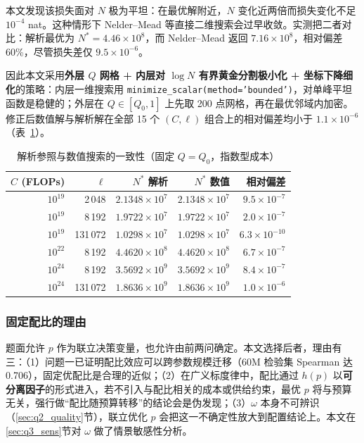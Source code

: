 本文发现该损失面对 $N$ 极为平坦：在最优解附近，$N$ 变化近两倍而损失变化不足 $10^{-4}$ nat。这种情形下 Nelder--Mead 等直接二维搜索会过早收敛。实测把二者对比：解析最优为 $N^\ast=4.46\times10^8$，而 Nelder--Mead 返回 $7.16\times10^8$，相对偏差 60\%，尽管损失差仅 $9.5\times10^{-6}$。

因此本文采用\textbf{外层 $Q$ 网格 + 内层对 $\log N$ 有界黄金分割极小化 + 坐标下降细化}的策略：内层一维搜索用 \texttt{minimize\_scalar(method='bounded')}，对单峰平坦函数是稳健的；外层在 $Q\in[Q_0,1]$ 上先取 200 点网格，再在最优邻域内加密。修正后数值解与解析解在全部 15 个 $(C,\ell)$ 组合上的相对偏差均小于 $1.1\times10^{-6}$（表~\ref{tab:q3_analytic}）。

\begin{table}[htbp]
\centering
\caption{解析参照与数值搜索的一致性（固定 $Q=Q_0$，指数型成本）}
\label{tab:q3_analytic}
\small
\begin{tabular}{r|r|r|r|r}
\toprule
$C$ (FLOPs) & $\ell$ & $N^\ast$ 解析 & $N^\ast$ 数值 & 相对偏差 \\
\midrule
$10^{19}$ & 2\,048 & $2.1348\times10^{7}$ & $2.1348\times10^{7}$ & $9.5\times10^{-7}$ \\
$10^{19}$ & 8\,192 & $1.9722\times10^{7}$ & $1.9722\times10^{7}$ & $2.0\times10^{-7}$ \\
$10^{19}$ & 131\,072 & $1.0298\times10^{7}$ & $1.0298\times10^{7}$ & $6.3\times10^{-10}$ \\
$10^{22}$ & 8\,192 & $4.4620\times10^{8}$ & $4.4620\times10^{8}$ & $6.7\times10^{-7}$ \\
$10^{24}$ & 8\,192 & $3.5692\times10^{9}$ & $3.5692\times10^{9}$ & $8.4\times10^{-7}$ \\
$10^{24}$ & 131\,072 & $1.8636\times10^{9}$ & $1.8636\times10^{9}$ & $1.0\times10^{-6}$ \\
\bottomrule
\end{tabular}
\end{table}

\subsubsection{固定配比的理由}
\label{sec:q3_fixp}

题面允许 $p$ 作为联立决策变量，也允许由前两问确定。本文选择后者，理由有三：（1）问题一已证明配比效应可以跨参数规模迁移（60M 检验集 Spearman 达 0.706），固定优配比是合理的近似；（2）在广义标度律中，配比通过 $h(p)$ 以\textbf{可分离因子}的形式进入，若不引入与配比相关的成本或供给约束，最优 $p$ 将与预算无关，强行做``配比随预算转移''的结论会是伪发现；（3）$\omega$ 本身不可辨识（\ref{sec:q2_quality}节），联立优化 $p$ 会把这一不确定性放大到配置结论上。本文在\ref{sec:q3_sens}节对 $\omega$ 做了情景敏感性分析。

